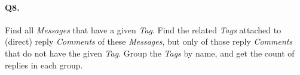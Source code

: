 \paragraph{Q8.}
Find all \emph{Messages} that have a given \emph{Tag}. Find the related
\emph{Tags} attached to (direct) reply \emph{Comments} of these
\emph{Messages}, but only of those reply \emph{Comments} that do not
have the given \emph{Tag}.
Group the \emph{Tags} by name, and get the count of replies in each
group.
